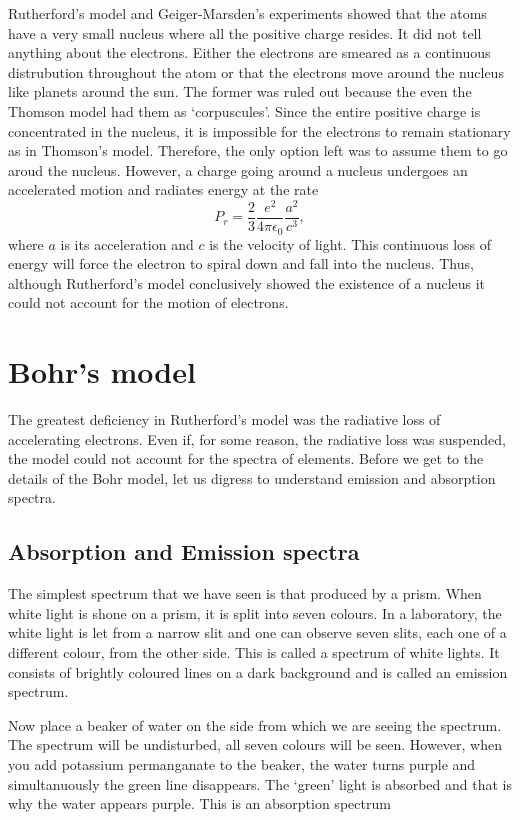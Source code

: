 Rutherford's model and Geiger-Marsden's experiments showed that the atoms have
a very small nucleus where all the positive charge resides. It did not tell 
anything about the electrons. Either the electrons are smeared as a continuous
distrubution throughout the atom or that the electrons move around the nucleus
like planets around the sun. The former was ruled out because the even the
Thomson model had them as `corpuscules'. Since the entire positive charge is
concentrated in the nucleus, it is impossible for the electrons to remain
stationary as in Thomson's model. Therefore, the only option left was to assume
them to go aroud the nucleus. However, a charge going around a nucleus undergoes
an accelerated motion and radiates energy at the rate \cite[equation (20-44)]{
reitz2009foundations}
\begin{equation}\label{c3s2e21}
P_r = \frac{2}{3}\frac{e^2}{4\pi\epsilon_0}\frac{a^2}{c^3},
\end{equation}
where $a$ is its acceleration and $c$ is the velocity of light. This continuous
loss of energy will force the electron to spiral down and fall into the nucleus.
Thus, although Rutherford's model conclusively showed the existence of a nucleus
it could not account for the motion of electrons.

\section{Bohr's model}\label{c3s3}
The greatest deficiency in Rutherford's model was the radiative loss of 
accelerating electrons. Even if, for some reason, the radiative loss was 
suspended, the model could not account for the spectra of elements. Before we 
get to the details of the Bohr model, let us digress to understand emission
and absorption spectra.

\subsection{Absorption and Emission spectra}
The simplest spectrum that we have seen is that produced by a prism. When white
light is shone on a prism, it is split into seven colours. In a laboratory, the
white light is let from a narrow slit and one can observe seven slits, each one
of a different colour, from the other side. This is called a spectrum of white
lights. It consists of brightly coloured lines on a dark background and is 
called an emission spectrum.

Now place a beaker of water on the side from which we are seeing the spectrum.
The spectrum will be undisturbed, all seven colours will be seen. However, when
you add potassium permanganate to the beaker, the water turns purple and 
simultanuously the green line disappears. The `green' light is absorbed and that
is why the water appears purple. This is an absorption spectrum